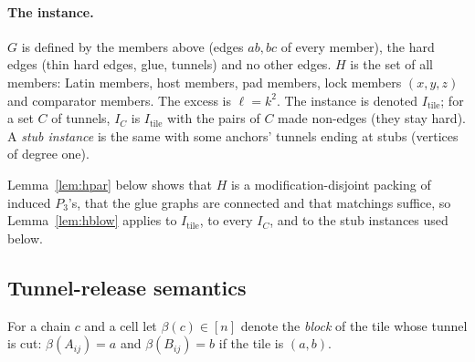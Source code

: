 \paragraph{The instance.} $G$ is defined by the members above (edges $ab,bc$ of every member), the hard edges (thin hard edges, glue, tunnels) and no other edges. $H$ is the set of all members: Latin members, host members, pad members, lock members $(x,y,z)$ and comparator members. The excess is $\ell=k^2$. The instance is denoted $I_{\mathrm{tile}}$; for a set $C$ of tunnels, $I_C$ is $I_{\mathrm{tile}}$ with the pairs of $C$ made non-edges (they stay hard). A \emph{stub instance} is the same with some anchors' tunnels ending at stubs (vertices of degree one).

Lemma~\ref{lem:hpar} below shows that $H$ is a modification-disjoint packing of induced $P_3$'s, that the glue graphs are connected and that matchings suffice, so Lemma~\ref{lem:hblow} applies to $I_{\mathrm{tile}}$, to every $I_C$, and to the stub instances used below.

\subsection{Tunnel-release semantics}\label{sec:hTR}
For a chain $c$ and a cell let $\beta(c)\in[n]$ denote the \emph{block} of the tile whose tunnel is cut: $\beta(A_{ij})=a$ and $\beta(B_{ij})=b$ if the tile is $(a,b)$.


